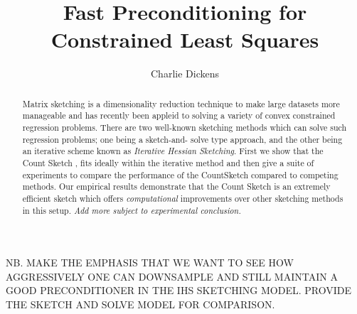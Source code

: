 \documentclass[twoside]{article}
\title{Fast Preconditioning for Constrained Least Squares}
\author{Charlie Dickens}
\date{}
\theoremstyle{definition}\newtheorem{thm}{Theorem}[section]
\theoremstyle{definition}\newtheorem{mydef}[thm]{Definition}
\theoremstyle{definition}\newtheorem{rem}[thm]{Remark}
\theoremstyle{definition}\newtheorem{prop}[thm]{Proposition}
\theoremstyle{definition}\newtheorem{example}[thm]{Example}
\theoremstyle{definition}\newtheorem{claim}[thm]{Claim}
\theoremstyle{definition}\newtheorem{Qu}[thm]{Question}
\theoremstyle{definition}\newtheorem{Lemma}[thm]{Lemma}
\theoremstyle{definition}\newtheorem{Cor}[thm]{Corollary}
\theoremstyle{definition}\newtheorem{Fact}[]{Fact}
\begin{document}
\maketitle

%

%





\begin{abstract}
  Matrix sketching is a dimensionality reduction technique to make large datasets
  more manageable and has recently been appleid to solving a variety of
  convex constrained regression problems.
  There are two well-known sketching methods which can solve such
  regression problems; one being a sketch-and-
  solve type approach, and the other being an iterative scheme known as \textit{
  Iterative Hessian Sketching}.
  First we show that the
  Count Sketch \cite{clarkson2013low}, fits ideally within the iterative method
  and then give a suite of experiments to compare the performance of
  the CountSketch compared to competing methods.
  Our empirical results demonstrate that the Count Sketch is an extremely efficient
  sketch which offers \textit{computational} improvements over other sketching
  methods in this setup.
  \textit{Add more subject to experimental conclusion.}
\end{abstract}

NB. MAKE THE EMPHASIS THAT WE WANT TO SEE
HOW AGGRESSIVELY ONE CAN DOWNSAMPLE AND
STILL MAINTAIN A GOOD PRECONDITIONER IN
THE IHS SKETCHING MODEL.
PROVIDE THE SKETCH AND SOLVE MODEL FOR
COMPARISON.
\end{document}
